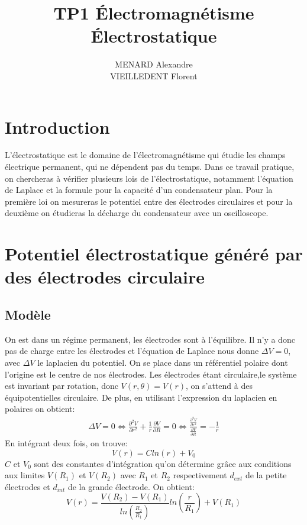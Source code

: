 \documentclass[12pt]{article}
\title{\textbf{TP1 Électromagnétisme} \\ Électrostatique}
\author{MENARD Alexandre \\ VIEILLEDENT Florent}
\begin{document}
\maketitle

\section*{Introduction}
L'électrostatique est le domaine de l'électromagnétisme qui étudie les champs électrique permanent, qui ne dépendent pas du temps.
Dans ce travail pratique, on chercheras à vérifier plusieurs lois de l'électrostatique, notamment l'équation de Laplace et la formule pour la capacité d'un condensateur plan. 
Pour la première loi on mesureras le potentiel entre des électrodes circulaires et pour la deuxième on étudieras la décharge du condensateur avec un oscilloscope.

\section{Potentiel électrostatique généré par des électrodes circulaire}
	\subsection{Modèle}
	On est dans un régime permanent, les électrodes sont à l'équilibre. Il n'y a donc pas de charge entre les électrodes et l'équation de Laplace nous donne $\Delta V =0$, avec $\Delta V$ le laplacien du potentiel. On se place dans un référentiel polaire dont l'origine est le centre de nos électrodes. Les électrodes étant circulaire,le système est invariant par rotation, donc $V(r,\theta)=V(r)$, on s'attend à des équipotentielles circulaire. De plus, en utilisant l'expression du laplacien en polaires on obtient:
	\begin{align}
\Delta V=0 \Longleftrightarrow \frac{\partial^2 V}{\partial r^2}+\frac{1}{r}\frac{\partial V}{\partial R}=0 \Longleftrightarrow \frac{\frac{\partial^2 V}{\partial r^2}}{\frac{\partial V}{\partial R}}=-\frac{1}{r} 
	\end{align}		
En intégrant deux fois, on trouve:
\begin{equation}
V(r)=Cln(r)+V_0
\end{equation}
$C$ et $V_0$ sont des constantes d'intégration qu'on détermine grâce aux conditions aux limites $V(R_1)$ et $V(R_2)$ avec $R_1$ et $R_2$ respectivement $d_{ext}$ de la petite électrodes et $d_{int}$ de la grande électrode. On obtient:
\begin{equation}
V(r)=\frac{V(R_2)-V(R_1)}{ln(\frac{R_2}{R_1})}ln(\frac{r}{R_1})+V(R_1)
\end{equation}
\end{document}

